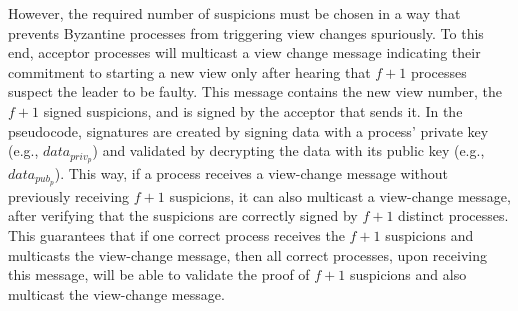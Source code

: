 However, the required number of suspicions must be chosen in a way that prevents Byzantine processes from triggering view changes spuriously. 
To this end, acceptor processes will multicast a view change message indicating their commitment to starting a new view only after hearing that $f+1$ processes 
suspect the leader to be faulty. This message contains the new view number, the $f+1$ signed suspicions, and is signed by the acceptor that sends it. In the pseudocode, signatures are created by signing data with a process' private key (e.g., $data_{priv_p}$) and validated by decrypting the data with its public key (e.g., $data_{pub_p}$).
This way, if a process receives a view-change message without previously receiving $f+1$ suspicions, 
it can also multicast a view-change message, after verifying that the suspicions are correctly signed by $f+1$ distinct processes.
This guarantees that if one correct process receives the $f+1$ suspicions and multicasts the view-change message, then all correct processes, upon receiving this message, will be able to validate the proof of $f+1$ suspicions and also multicast the view-change message.\par
